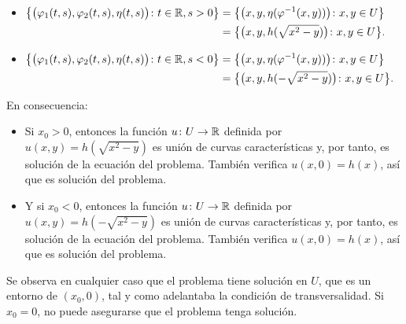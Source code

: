 \documentclass[a4paper, 12pt, extrafontsizes]{memoir}
\begin{document}
\begin{solution}
\begin{enumerate}
\begin{itemize}
        \item
        $\begin{aligned}[t]
            \bigl\{\bigl(\varphi_1(t,s),\varphi_2(t,s),\eta(t,s)\bigr) \colon t \in \mathbb R, s > 0\bigr\} &= \bigl\{\bigl(x,y,\eta (\varphi^{-1}(x,y))\bigr) \colon x,y \in U\bigr\} \\
            &= \bigl\{\bigl(x,y, h(\textstyle{\sqrt{x^2-y}})\bigr) \colon x,y \in U\bigr\}.
        \end{aligned}$
        \item
        $\begin{aligned}[t]
            \bigl\{\bigl(\varphi_1(t,s),\varphi_2(t,s),\eta(t,s)\bigr) \colon t \in \mathbb R, s < 0\bigr\} &= \bigl\{\bigl(x,y,\eta (\varphi^{-1}(x,y))\bigr) \colon x,y \in U\bigr\} \\
            &= \bigl\{\bigl(x,y, h(\textstyle{-\sqrt{x^2-y}})\bigr) \colon x,y \in U\bigr\}.
        \end{aligned}$
    \end{itemize}
    En consecuencia:
    \begin{itemize}
        \item Si $x_0 > 0$, entonces la función $u \colon U \to \mathbb R$ definida por $u(x,y) = h(\sqrt{x^2-y})$ es unión de curvas características y, por tanto, es solución de la ecuación del problema. También verifica $u(x,0) = h(x)$, así que es solución del problema.
        \item Y si $x_0 < 0$, entonces la función $u \colon U \to \mathbb R$ definida por $u(x,y) = h(-\sqrt{x^2-y})$ es unión de curvas características y, por tanto, es solución de la ecuación del problema. También verifica $u(x,0) = h(x)$, así que es solución del problema. 
    \end{itemize} 
    Se observa en cualquier caso que el problema tiene solución en $U$, que es un entorno de $(x_0,0)$, tal y como adelantaba la condición de transversalidad. Si $x_0 = 0$, no puede asegurarse que el problema tenga solución.
\end{enumerate}
\end{solution}

\newpage
\end{document}
